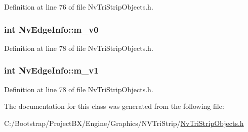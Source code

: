 Definition at line 76 of file NvTriStripObjects.h.\hypertarget{class_nv_edge_info_ab5ae98466f8fc0410c6aef3b8a59036}{
\subsubsection[{m\_\-v0}]{\setlength{\rightskip}{0pt plus 5cm}int {\bf NvEdgeInfo::m\_\-v0}}}
\label{class_nv_edge_info_ab5ae98466f8fc0410c6aef3b8a59036}




Definition at line 78 of file NvTriStripObjects.h.\hypertarget{class_nv_edge_info_063470f926ea6ee73985f6c8986d8ce0}{
\subsubsection[{m\_\-v1}]{\setlength{\rightskip}{0pt plus 5cm}int {\bf NvEdgeInfo::m\_\-v1}}}
\label{class_nv_edge_info_063470f926ea6ee73985f6c8986d8ce0}




Definition at line 78 of file NvTriStripObjects.h.

The documentation for this class was generated from the following file:\begin{CompactItemize}
\item 
C:/Bootstrap/ProjectBX/Engine/Graphics/NVTriStrip/\hyperlink{_nv_tri_strip_objects_8h}{NvTriStripObjects.h}\end{CompactItemize}

